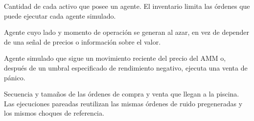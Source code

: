 \begin{description}[style=unboxed,leftmargin=0pt,labelwidth=0pt,labelsep=0.5em,itemsep=0.1em]
  \item[Inventario:] Cantidad de cada activo que posee un agente. El inventario limita las órdenes que puede ejecutar cada agente simulado.
  \item[Negociador de ruido:] Agente cuyo lado y momento de operación se generan al azar, en vez de depender de una señal de precios o información sobre el valor.
  \item[Agente de tendencia/pánico:] Agente simulado que sigue un movimiento reciente del precio del AMM o, después de un umbral especificado de rendimiento negativo, ejecuta una venta de pánico.
  \item[Flujo de órdenes:] Secuencia y tamaños de las órdenes de compra y venta que llegan a la piscina. Las ejecuciones pareadas reutilizan las mismas órdenes de ruido pregeneradas y los mismos choques de referencia.
\end{description}

